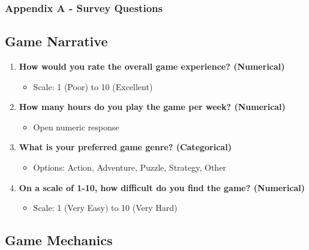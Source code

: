 \documentclass[
  letterpaper,
  DIV=11,
  numbers=noendperiod]{scrartcl}
\providecommand{\tightlist}{%
  \setlength{\itemsep}{0pt}\setlength{\parskip}{0pt}}\usepackage{longtable,booktabs,array}
\begin{document}
\subsubsection{Appendix A - Survey
Questions}\label{appendix-a---survey-questions}

\subsection{Game Narrative}\label{game-narrative}

\begin{enumerate}
\def\labelenumi{\arabic{enumi}.}
\tightlist
\item
  \textbf{How would you rate the overall game experience? (Numerical)}

  \begin{itemize}
  \tightlist
  \item
    Scale: 1 (Poor) to 10 (Excellent)
  \end{itemize}
\item
  \textbf{How many hours do you play the game per week? (Numerical)}

  \begin{itemize}
  \tightlist
  \item
    Open numeric response
  \end{itemize}
\item
  \textbf{What is your preferred game genre? (Categorical)}

  \begin{itemize}
  \tightlist
  \item
    Options: Action, Adventure, Puzzle, Strategy, Other
  \end{itemize}
\item
  \textbf{On a scale of 1-10, how difficult do you find the game?
  (Numerical)}

  \begin{itemize}
  \tightlist
  \item
    Scale: 1 (Very Easy) to 10 (Very Hard)
  \end{itemize}
\end{enumerate}

\subsection{Game Mechanics}\label{game-mechanics}
\end{document}

